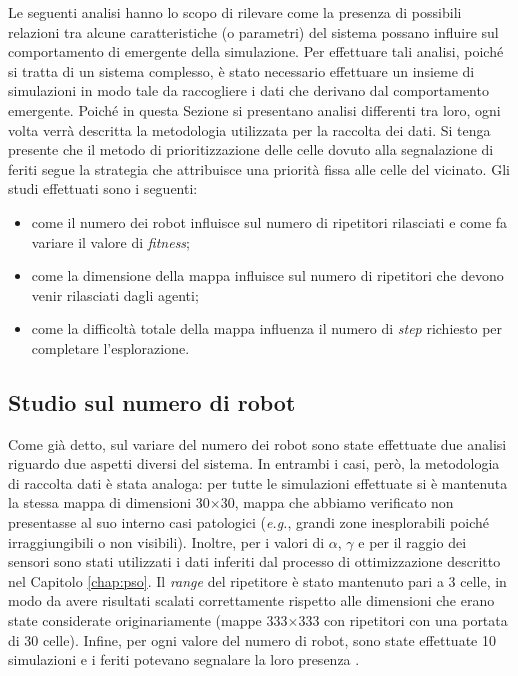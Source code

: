 Le seguenti analisi hanno lo scopo di rilevare come la presenza di possibili relazioni tra alcune caratteristiche (o parametri) del sistema possano influire sul comportamento di emergente della simulazione.
Per effettuare tali analisi, poiché si tratta di un sistema complesso, è stato necessario effettuare un insieme di simulazioni in modo tale da raccogliere i dati che derivano dal comportamento emergente.
Poiché in questa Sezione si presentano analisi differenti tra loro, ogni volta verrà descritta la metodologia utilizzata per la raccolta dei dati.
Si tenga presente che il metodo di prioritizzazione delle celle dovuto alla segnalazione di feriti segue la strategia che attribuisce una priorità fissa alle celle del vicinato.
Gli studi effettuati sono i seguenti:\begin{itemize}
	\item come il numero dei robot influisce sul numero di ripetitori rilasciati e come fa variare il valore di \textit{fitness};
	\item come la dimensione della mappa influisce sul numero di ripetitori che devono venir rilasciati dagli agenti;
	\item come la difficoltà totale della mappa influenza il numero di \textit{step} richiesto per completare l'esplorazione.
\end{itemize}
\subsection{Studio sul numero di robot}
\label{subsec:nrobots}
Come già detto, sul variare del numero dei robot sono state effettuate due analisi riguardo due aspetti diversi del sistema.
In entrambi i casi, però, la metodologia di raccolta dati è stata analoga: per tutte le simulazioni effettuate si è mantenuta la stessa mappa di dimensioni 30$\times$30, mappa che abbiamo verificato non presentasse al suo interno casi patologici (\textit{e.g.}, grandi zone inesplorabili poiché irraggiungibili o non visibili).
Inoltre, per i valori di $\alpha$, $\gamma$ e per il raggio dei sensori sono stati utilizzati i dati inferiti dal processo di ottimizzazione descritto nel Capitolo \ref{chap:pso}. Il \textit{range} del ripetitore è stato mantenuto pari a 3 celle, in modo da avere risultati scalati correttamente rispetto alle dimensioni che erano state considerate originariamente (mappe 333$\times$333 con ripetitori con una portata di 30 celle). Infine, per ogni valore del numero di robot, sono state effettuate 10 simulazioni e i feriti potevano segnalare la loro presenza .

